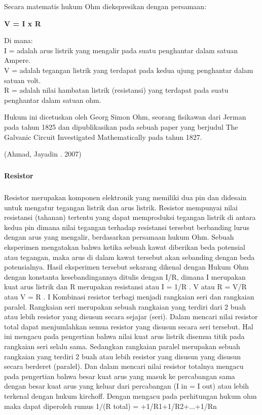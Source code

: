 \documentclass[12pt,a4paper]{article}
\begin{document}
Secara matematis hukum Ohm diekspresikan dengan persamaan:

\textbf{V = I x R}

Di mana:
\\ I = adalah arus listrik yang mengalir pada suatu penghantar dalam satuan Ampere.
\\ V = adalah tegangan listrik yang terdapat pada kedua ujung penghantar dalam satuan volt.
\\ R = adalah nilai hambatan listrik (resistansi) yang terdapat pada suatu penghantar dalam satuan ohm.

Hukum ini dicetuskan oleh Georg Simon Ohm, seorang fisikawan dari Jerman pada tahun 1825 dan dipublikasikan pada sebuah paper yang berjudul The Galvanic Circuit Investigated Mathematically pada tahun 1827.
\begin{flushright}
(Ahmad, Jayadin . 2007) 
\end{flushright}
\subparagraph{ }
\textbf{Resistor}
\subparagraph{ }
	\begin{figure}
	
	\end{figure}
	Resistor merupakan komponen elektronik yang memiliki dua pin dan didesain untuk mengatur tegangan listrik dan arus listrik. Resistor mempunyai nilai resistansi (tahanan) tertentu yang dapat memproduksi tegangan listrik di antara kedua pin dimana nilai tegangan terhadap resistansi tersebut berbanding lurus dengan arus yang mengalir, berdasarkan persamaan hukum Ohm. Sebuah eksperimen mengatakan bahwa ketika sebuah kawat diberikan beda potensial atau tegangan, maka arus di dalam kawat tersebut akan sebanding dengan beda potensialnya. Hasil eksperimen tersebut sekarang dikenal dengan Hukum Ohm dengan konstanta kesebandingannya ditulis dengan I/R, dimana I merupakan kuat arus listrik dan R merupakan resistansi atau I = 1/R . V atau R = V/R atau V = R . I
	Kombinasi resistor terbagi menjadi rangkaian seri dan rangkaian paralel. Rangkaian seri merupakan sebuah rangkaian yang terdiri dari 2 buah atau lebih resistor yang disusun secara sejajar (seri). Dalam mencari nilai resistor total dapat menjumlahkan semua resistor yang disusun secara seri tersebut. Hal ini mengacu pada pengertian bahwa nilai kuat arus listrik disemua titik pada rangkaian seri selalu sama. Sedangkan rangkaian paralel merupakan sebuah rangkaian yang terdiri 2 buah atau lebih resistor yang disusun yang disusun secara berderet (paralel). Dan dalam mencari nilai resistor totalnya mengacu pada pengertian bahwa besar kuat arus yang masuk ke percabangan sama dengan besar kuat arus yang keluar dari percabangan (I in = I out) atau lebih terkenal dengan hukum kirchoff. Dengan mengacu pada perhitungan hukum ohm maka dapat diperoleh rumus 1/(R total) = +1/R1+1/R2+...+1/Rn
 
\end{document}
